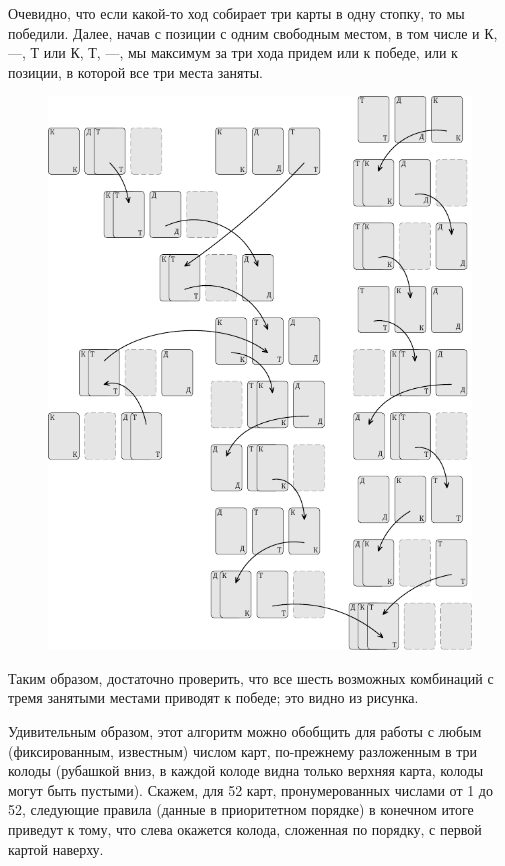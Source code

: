 \documentclass[twoside]{book}
\begin{document}
Очевидно, что если какой-то ход собирает три карты в одну стопку, то
мы победили. Далее,
начав с позиции с одним свободным местом, в том числе и К, ---, Т или
К, Т, ---, мы максимум за три хода придем или к победе, или к позиции,
в которой все три места заняты.
\begin{figure}[!ht]
\centering
\includegraphics[scale=.98]{mp/wink-24}
\end{figure}
Таким образом, достаточно проверить, что все шесть возможных
комбинаций с тремя занятыми местами приводят к победе; это видно из рисунка.
\heart

Удивительным образом, этот алгоритм можно обобщить для работы с любым
(фиксированным, известным) числом карт, по-прежнему разложенным в три
колоды (рубашкой вниз, в каждой колоде видна только верхняя карта,
колоды могут быть пустыми).
Скажем, для 52 карт, пронумерованных числами от 1 до 52, следующие правила (данные в приоритетном порядке) в конечном итоге приведут к тому, что слева окажется колода, сложенная по порядку, с первой картой наверху.
\end{document}
